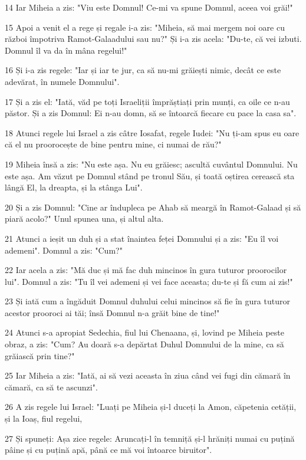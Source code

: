 \par 14 Iar Miheia a zis: "Viu este Domnul! Ce-mi va spune Domnul, aceea voi grăi!"
\par 15 Apoi a venit el a rege și regale i-a zis: "Miheia, să mai mergem noi oare cu război împotriva Ramot-Galaadului sau nu?" Și i-a zis acela: "Du-te, că vei izbuti. Domnul îl va da în mâna regelui!"
\par 16 Și i-a zis regele: "Iar și iar te jur, ca să nu-mi grăiești nimic, decât ce este adevărat, în numele Domnului".
\par 17 Și a zis el: "Iată, văd pe toți Israeliții împrăștiați prin munți, ca oile ce n-au păstor. Și a zis Domnul: Ei n-au domn, să se întoarcă fiecare cu pace la casa sa".
\par 18 Atunci regele lui Israel a zis câtre Iosafat, regele Iudei: "Nu ți-am spus eu oare că el nu proorocește de bine pentru mine, ci numai de rău?"
\par 19 Miheia însă a zis: "Nu este așa. Nu eu grăiesc; ascultă cuvântul Domnului. Nu este așa. Am văzut pe Domnul stând pe tronul Său, și toată oștirea cerească sta lângă El, la dreapta, și la stânga Lui".
\par 20 Și a zis Domnul: "Cine ar îndupleca pe Ahab să meargă în Ramot-Galaad și să piară acolo?" Unul spunea una, și altul alta.
\par 21 Atunci a ieșit un duh și a stat înaintea feței Domnului și a zis: "Eu îl voi ademeni". Domnul a zis: "Cum?"
\par 22 Iar acela a zis: "Mă duc și mă fac duh mincinos în gura tuturor proorocilor lui". Domnul a zis: "Tu îl vei ademeni și vei face aceasta; du-te și fă cum ai zis!"
\par 23 Și iată cum a îngăduit Domnul duhului celui mincinos să fie în gura tuturor acestor prooroci ai tăi; însă Domnul n-a grăit bine de tine!"
\par 24 Atunci s-a apropiat Sedechia, fiul lui Chenaana, și, lovind pe Miheia peste obraz, a zis: "Cum? Au doară s-a depărtat Duhul Domnului de la mine, ca să grăiască prin tine?"
\par 25 Iar Miheia a zis: "Iată, ai să vezi aceasta în ziua când vei fugi din cămară în cămară, ca să te ascunzi".
\par 26 A zis regele lui Israel: "Luați pe Miheia și-l duceți la Amon, căpetenia cetății, și la Ioaș, fiul regelui,
\par 27 Și spuneți: Așa zice regele: Aruncați-l în temniță și-l hrăniți numai cu puțină pâine și cu puțină apă, până ce mă voi întoarce biruitor".
